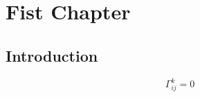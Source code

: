 \chapter{Fist Chapter}\label{chp:fist_chapter}

\section{Introduction}\label{sec:introduction}

\[
	\Gamma_{ij}^{k}=0
\]
